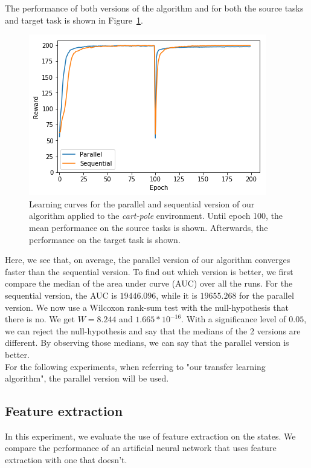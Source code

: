 The performance of both versions of the algorithm and for both the source tasks and target task is shown in Figure~\ref{fig:CartPole:reward_akt-kt_all_5tasks}.
\begin{figure}[htb]
    \centering
    \includegraphics[width=.8\linewidth]{images/results/CartPole/kt_akt/reward_source-target_5tasks.png}
    \caption[Learning curves for the parallel and sequential version of our algorithm applied to the \textit{cart-pole} environment]{Learning curves for the parallel and sequential version of our algorithm applied to the \textit{cart-pole} environment. Until epoch 100, the mean performance on the source tasks is shown. Afterwards, the performance on the target task is shown.}
    \label{fig:CartPole:reward_akt-kt_all_5tasks}
\end{figure}
Here, we see that, on average, the parallel version of our algorithm converges faster than the sequential version.
To find out which version is better, we first compare the median of the area under curve (AUC) over all the runs.
For the sequential version, the AUC is $19446.096$, while it is $19655.268$ for the parallel version.
We now use a Wilcoxon rank-sum test with the null-hypothesis that there is no.
We get $W=8.244$ and $1.665*10^{-16}$.
With a significance level of $0.05$, we can reject the null-hypothesis and say that the medians of the 2 versions are different.
By observing those medians, we can say that the parallel version is better.\\
For the following experiments, when referring to "our transfer learning algorithm", the parallel version will be used.

\subsection{Feature extraction} %
\label{sub:feature_extraction}
In this experiment, we evaluate the use of feature extraction on the states. We compare the performance of an artificial neural network that uses feature extraction with one that doesn't.

